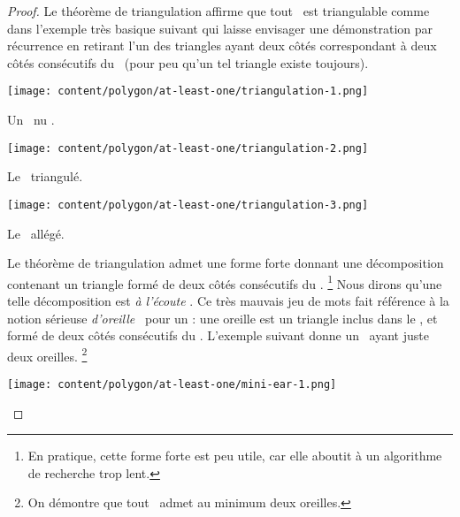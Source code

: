 \begin{proof}
	Le théorème de triangulation affirme que tout \ngone\ est triangulable comme dans l'exemple très basique suivant qui laisse envisager une démonstration par récurrence en retirant l'un des triangles ayant deux côtés correspondant à deux côtés consécutifs du \ngone\ (pour peu qu'un tel triangle existe toujours).


    \begin{multicols}{3}
        \small\itshape
        \begin{center}
            \texttt{[image: content/polygon/at-least-one/triangulation-1.png]}

            \smallskip
            Un \ngone\ \og nu \fg.
        \end{center}


        \begin{center}
            \texttt{[image: content/polygon/at-least-one/triangulation-2.png]}

            \smallskip
            Le \ngone\ triangulé.
        \end{center}


        \begin{center}
            \texttt{[image: content/polygon/at-least-one/triangulation-3.png]}

            \smallskip
            Le \ngone\ allégé.
        \end{center}
    \end{multicols}


    Le théorème de triangulation admet une forme forte donnant une décomposition contenant un triangle formé de deux côtés consécutifs du \ngone.%
    \footnote{
        En pratique, cette forme forte est peu utile, car elle aboutit à un algorithme de recherche trop lent.
    }
    Nous dirons qu'une telle décomposition est \og \emph{à l'écoute} \fg.
    Ce très mauvais jeu de mots fait référence à la notion sérieuse \og \emph{d'oreille} \fg\ pour un \ngone: une oreille est un triangle inclus dans le \ngone, et formé de deux côtés consécutifs du \ngone.
    L'exemple suivant donne un \ngone\ ayant juste deux oreilles.%
    \footnote{
        On démontre que tout \ngone\ admet au minimum deux oreilles.
    }


    \begin{multicols}{2}
        \small\itshape
    	\begin{center}
        	\texttt{[image: content/polygon/at-least-one/mini-ear-1.png]}


\end{center}
\end{multicols}
\end{proof}
